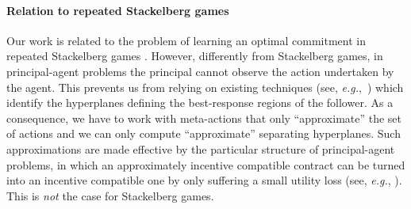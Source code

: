\paragraph{Relation to repeated Stackelberg games} Our work is related to the problem of learning an optimal commitment in repeated Stackelberg games \citep{letchford2009learning,Peng2019}. However, differently from Stackelberg games, in principal-agent problems the principal cannot observe the action undertaken by the agent.
%
This prevents us from relying on existing techniques (see, \emph{e.g.},~\citet{Peng2019}) which identify the hyperplanes defining the best-response regions of the follower.
%
As a consequence, we have to work with {meta-actions} that only ``approximate'' the set of actions and we can only compute ``approximate'' separating hyperplanes.
%
Such approximations are made effective by the particular structure of principal-agent problems, in which an approximately incentive compatible contract can be turned into an incentive compatible one by only suffering a small utility loss (see, \emph{e.g.}, \citep{dutting2021complexity, zhu2022sample}).
This is \emph{not} the case for Stackelberg games.
%
%







